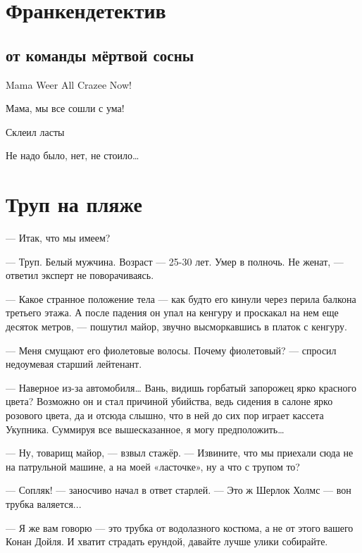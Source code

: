 \section*{Франкендетектив} %
\subsection*{от команды мёртвой сосны}
\begin{epigraph}
    Mama Weer All Crazee Now!
\end{epigraph}
\begin{epigraph}
    Мама, мы все сошли с ума!
\end{epigraph}
Склеил ласты
\begin{epigraph}
Не надо было, нет, не стоило…
\end{epigraph}

\section{Труп на пляже}
--- Итак, что мы имеем?

--- Труп. Белый мужчина. Возраст --- 25-30 лет. Умер в полночь. Не женат, --- ответил эксперт не поворачиваясь.

--- Какое странное положение тела --- как будто его кинули через перила балкона третьего этажа. А после падения он упал на кенгуру и проскакал на нем еще десяток метров, --- пошутил майор, звучно высморкавшись в платок с кенгуру.

--- Меня смущают его фиолетовые волосы. Почему фиолетовый? --- спросил недоумевая старший лейтенант.

--- Наверное из-за автомобиля… Вань, видишь горбатый запорожец ярко красного цвета? Возможно он и стал причиной убийства, ведь сидения в салоне ярко розового цвета, да и отсюда слышно, что в ней до сих пор играет кассета Укупника. Суммируя все вышесказанное, я могу предположить…

--- Ну, товарищ майор, --- взвыл стажёр. --- Извините, что мы приехали сюда не на патрульной машине, а на моей «ласточке», ну а что с трупом то?

--- Сопляк! --- заносчиво начал в ответ старлей. --- Это ж Шерлок Холмс --- вон трубка валяется...

--- Я же вам говорю --- это трубка от водолазного костюма, а не от этого вашего Конан Дойля. И хватит страдать ерундой, давайте лучше улики собирайте.

